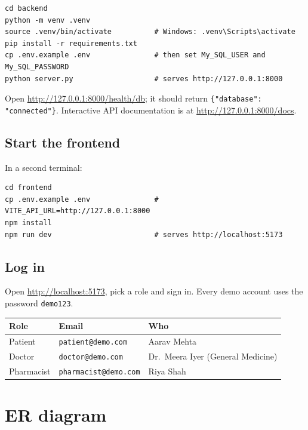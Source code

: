 \documentclass[11pt,a4paper]{article}
\newcommand{\code}[1]{\texttt{#1}}
\begin{document}
\begin{lstlisting}[style=bash]
cd backend
python -m venv .venv
source .venv/bin/activate          # Windows: .venv\Scripts\activate
pip install -r requirements.txt
cp .env.example .env               # then set My_SQL_USER and My_SQL_PASSWORD
python server.py                   # serves http://127.0.0.1:8000
\end{lstlisting}

Open \url{http://127.0.0.1:8000/health/db}; it should return \code{\{"database": "connected"\}}. Interactive API documentation is at \url{http://127.0.0.1:8000/docs}.

\subsection{Start the frontend}

In a second terminal:

\begin{lstlisting}[style=bash]
cd frontend
cp .env.example .env               # VITE_API_URL=http://127.0.0.1:8000
npm install
npm run dev                        # serves http://localhost:5173
\end{lstlisting}

\subsection{Log in}

Open \url{http://localhost:5173}, pick a role and sign in. Every demo account uses the password \code{demo123}.

\begin{center}
\small
\begin{tabular}{lll}
\toprule
\textbf{Role} & \textbf{Email} & \textbf{Who} \\
\midrule
Patient    & \code{patient@demo.com}    & Aarav Mehta \\
Doctor     & \code{doctor@demo.com}     & Dr.\ Meera Iyer (General Medicine) \\
Pharmacist & \code{pharmacist@demo.com} & Riya Shah \\
\bottomrule
\end{tabular}
\end{center}

\section{ER diagram}
\end{document}
